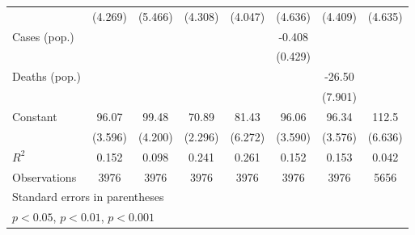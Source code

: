 \documentclass{article}
\begin{document}
{\begin{longtable}{l*{7}{c}}
                &  (4.269)         &  (5.466)         &  (4.308)         &  (4.047)         &  (4.636)         &  (4.409)         &  (4.635)         \\
Cases (pop.)    &                  &                  &                  &                  &   -0.408         &                  &                  \\
                &                  &                  &                  &                  &  (0.429)         &                  &                  \\
Deaths (pop.)   &                  &                  &                  &                  &                  &   -26.50\sym{**} &                  \\
                &                  &                  &                  &                  &                  &  (7.901)         &                  \\
Constant        &    96.07\sym{***}&    99.48\sym{***}&    70.89\sym{***}&    81.43\sym{***}&    96.06\sym{***}&    96.34\sym{***}&    112.5\sym{***}\\
                &  (3.596)         &  (4.200)         &  (2.296)         &  (6.272)         &  (3.590)         &  (3.576)         &  (6.636)         \\
\hline
\(R^{2}\)       &    0.152         &    0.098         &    0.241         &    0.261         &    0.152         &    0.153         &    0.042         \\
Observations    &     3976         &     3976         &     3976         &     3976         &     3976         &     3976         &     5656         \\
\hline\hline
\multicolumn{8}{l}{\footnotesize Standard errors in parentheses}\\
\multicolumn{8}{l}{\footnotesize \sym{*} \(p<0.05\), \sym{**} \(p<0.01\), \sym{***} \(p<0.001\)}\\
\end{longtable}
}
\end{document}
